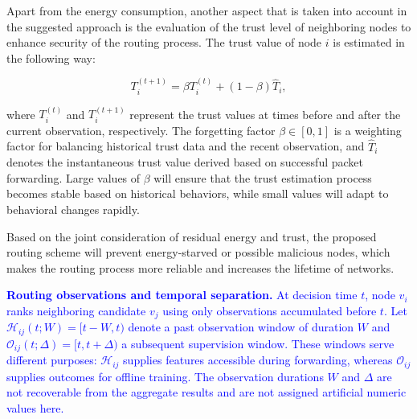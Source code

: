 \documentclass[pdflatex,sn-mathphys-num]{sn-jnl}
\newcommand{\Revised}[1]{\textcolor{blue}{#1}}
\begin{document}
Apart from the energy consumption, another aspect that is taken into account in the suggested approach is the evaluation of the trust level of neighboring nodes to enhance security of the routing process. The trust value of node $i$ is estimated in the following way:

\begin{equation}
T_i^{(t+1)}
=
\beta T_i^{(t)}
+
(1-\beta)\hat{T}_i,
\end{equation}

where $T_i^{(t)}$ and $T_i^{(t+1)}$ represent the trust values at times before and after the current observation, respectively. The forgetting factor $\beta\in[0,1]$ is a weighting factor for balancing historical trust data and the recent observation, and $\hat{T}_i$ denotes the instantaneous trust value derived based on successful packet forwarding. Large values of $\beta$ will ensure that the trust estimation process becomes stable based on historical behaviors, while small values will adapt to behavioral changes rapidly.

Based on the joint consideration of residual energy and trust, the proposed routing scheme will prevent energy-starved or possible malicious nodes, which makes the routing process more reliable and increases the lifetime of networks.

\Revised{\textbf{Routing observations and temporal separation.} At decision time $t$, node $v_i$ ranks neighboring candidate $v_j$ using only observations accumulated before $t$. Let $\mathcal H_{ij}(t;W)=[t-W,t)$ denote a past observation window of duration $W$ and $\mathcal O_{ij}(t;\Delta)=[t,t+\Delta)$ a subsequent supervision window. These windows serve different purposes: $\mathcal H_{ij}$ supplies features accessible during forwarding, whereas $\mathcal O_{ij}$ supplies outcomes for offline training. The observation durations $W$ and $\Delta$ are not recoverable from the aggregate results and are not assigned artificial numeric values here.}
\end{document}
